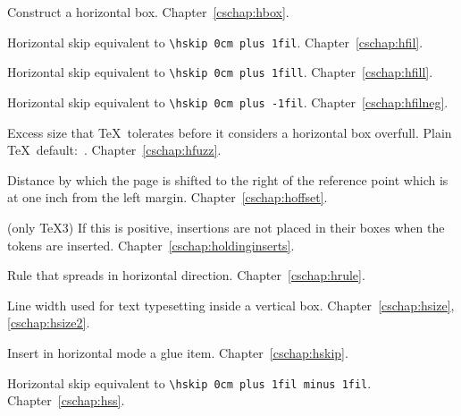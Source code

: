 \begin{glossinventory}
\item [\cs{hbox\gr{box specification}\lb\gr{horizontal material}\rb}]
      Construct a horizontal box. 
Chapter~\ref{cschap:hbox}.

\item [\cs{hfil}]
      Horizontal skip equivalent to \verb-\hskip 0cm plus 1fil-.
Chapter~\ref{cschap:hfil}.

\item [\cs{hfill}]
      Horizontal skip equivalent to \verb-\hskip 0cm plus 1fill-.
Chapter~\ref{cschap:hfill}.

\item [\cs{hfilneg}]
      Horizontal skip equivalent to \verb/\hskip 0cm plus -1fil/.
Chapter~\ref{cschap:hfilneg}.

\item [\cs{hfuzz}]
      Excess size that \TeX\ tolerates before it considers  
      a horizontal box overfull.
      Plain \TeX\ default:~\n{0.1pt}.
Chapter~\ref{cschap:hfuzz}.

\item [\cs{hoffset}]
      Distance by which the page is shifted to the right 
      of the reference point which is at one inch from
      the left margin.
Chapter~\ref{cschap:hoffset}.

\item [\cs{holdinginserts}]
      (only \TeX3) 
      If this is positive, insertions are not placed in their boxes 
      when the  tokens are inserted.
Chapter~\ref{cschap:holdinginserts}.

\item [\cs{hrule}]
      Rule that spreads in horizontal direction.
Chapter~\ref{cschap:hrule}.

\item [\cs{hsize}]
      Line width used for text typesetting inside a vertical box.
Chapter~\ref{cschap:hsize},\ref{cschap:hsize2}.

\item [\cs{hskip\gr{glue}}] 
      Insert in horizontal mode a glue item.
Chapter~\ref{cschap:hskip}.

\item [\cs{hss}]
      Horizontal skip equivalent to \verb-\hskip 0cm plus 1fil minus 1fil-.
Chapter~\ref{cschap:hss}.


\end{glossinventory}
